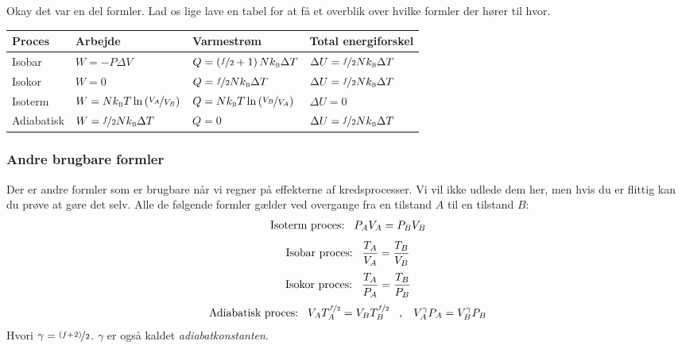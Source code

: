 \documentclass[crop=false, class=memoir]{standalone}
\begin{document}
Okay det var en del formler. Lad os lige lave en tabel for at få et overblik over hvilke formler der hører til hvor. 

\begin{table}
\centering
    \begin{tabular}{|l|l|l|l|}
        \hline
        Proces    & Arbejde & Varmestrøm & Total energiforskel \\ \hline
        Isobar     &    $W = -P\Delta V$     &  $Q = \left(\nicefrac{f}{2} + 1\right) N k_\textsc{b} \Delta T$  &    $\Delta U = \nicefrac{f}{2}N k_\textsc{b} \Delta T$ \\ \hline
        Isokor     & $W = 0$ & $Q = \nicefrac{f}{2}N k_\textsc{b} \Delta T$  &  $\Delta U = \nicefrac{f}{2}N k_\textsc{b} \Delta T$  \\ \hline
        Isoterm    & $W = Nk_\textsc{b} T\ln{\left(\nicefrac{V_A}{V_B}\right)}$        & $Q = Nk_\textsc{b} T \ln{\left(\nicefrac{V_B}{V_A}\right)}$     & $\Delta U = 0$      \\ \hline
        Adiabatisk &     $W = \nicefrac{f}{2} Nk_\textsc{b} \Delta T$    & $Q = 0$       &  $\Delta U = \nicefrac{f}{2}N k_\textsc{b} \Delta T$        \\ \hline
\end{tabular}
\end{table}

\subsubsection{Andre brugbare formler}

Der er andre formler som er brugbare når vi regner på effekterne af kredsprocesser. Vi vil ikke udlede dem her, men hvis du er flittig kan du prøve at gøre det selv. Alle de følgende formler gælder ved overgange fra en tilstand $A$ til en tilstand $B$:
\begin{align}
    \text{Isoterm proces:} \hspace{3mm} P_A V_A = P_B V_B
    \label{termo:eq:isoterm_relation}
\end{align}
\begin{align}
    \text{Isobar proces:} \hspace{3mm} \frac{T_A}{V_A} = \frac{T_B}{V_B}
    \label{termo:eq:isobar_relation}
\end{align}
\begin{align}
    \text{Isokor proces:} \hspace{3mm} \frac{T_A}{P_A} = \frac{T_B}{P_B}
    \label{termo:eq:isokor_relation}
\end{align}
\begin{align}
    \text{Adiabatisk proces:} \hspace{3mm} V_A T^{\nicefrac{f}{2}}_A = V_B T^{\nicefrac{f}{2}}_B  \hspace{3mm},\hspace{3mm} V^{\gamma}_A P_A = V^{\gamma}_B P_B
    \label{termo:eq:adiabat_relation}
\end{align}
Hvori $\gamma = \nicefrac{(f+2)}{2}$. $\gamma$ er også kaldet \emph{adiabatkonstanten}.
\end{document}

